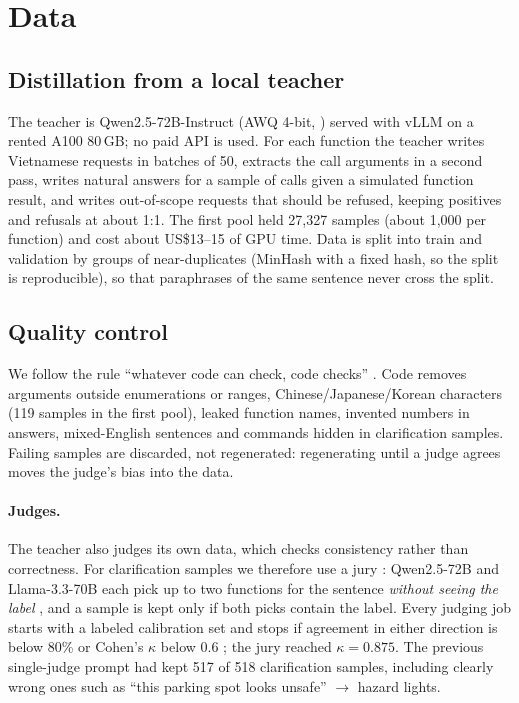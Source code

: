 \section{Data}
\label{sec:data}

\subsection{Distillation from a local teacher}
\label{sec:generation}

The teacher is Qwen2.5-72B-Instruct (AWQ 4-bit, \citealp{lin2024awq}) served with vLLM \citep{kwon2023vllm} on a rented A100
80\,GB; no paid API is used. For each function the teacher writes Vietnamese requests in batches of 50, extracts the call
arguments in a second pass, writes natural answers for a sample of calls given a simulated function result, and writes
out-of-scope requests that should be refused, keeping positives and refusals at about 1:1. The first pool held 27,327 samples
(about 1,000 per function) and cost about US\$13--15 of GPU time. Data is split into train and validation by groups of
near-duplicates (MinHash with a fixed hash, so the split is reproducible), so that paraphrases of the same sentence never
cross the split.

\subsection{Quality control}
\label{sec:quality}

We follow the rule ``whatever code can check, code checks'' \citep{liu2024apigen,liu2024toolace}. Code removes arguments
outside enumerations or ranges, Chinese/Japanese/Korean characters (119 samples in the first pool), leaked function names,
invented numbers in answers, mixed-English sentences and commands hidden in clarification samples. Failing samples are
discarded, not regenerated: regenerating until a judge agrees moves the judge's bias into the data.

\paragraph{Judges.}
The teacher also judges its own data, which checks consistency rather than correctness. For clarification samples we
therefore use a jury \citep{verga2024juries}: Qwen2.5-72B and Llama-3.3-70B \citep{grattafiori2024llama3} each pick up to two
functions for the sentence \emph{without seeing the label} \citep{zheng2023judging}, and a sample is kept only if both picks
contain the label. Every judging job starts with a labeled calibration set and stops if agreement in either direction is
below 80\% or Cohen's $\kappa$ below 0.6 \citep{thakur2025judging}; the jury reached $\kappa=0.875$. The previous single-judge
prompt had kept 517 of 518 clarification samples, including clearly wrong ones such as ``this parking spot looks unsafe''
$\rightarrow$ hazard lights.

